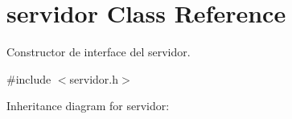 \hypertarget{classservidor}{}\section{servidor Class Reference}
\label{classservidor}


Constructor de interface del servidor.  




{\ttfamily \#include $<$servidor.\+h$>$}



Inheritance diagram for servidor\+:
